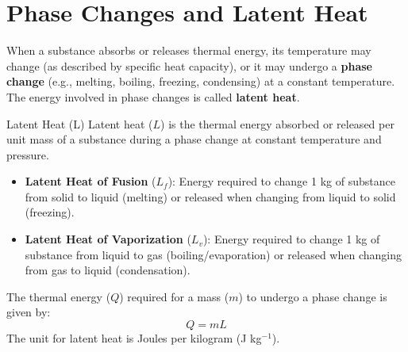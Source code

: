 \section{Phase Changes and Latent Heat}
\label{sec:latent_heat}
\FloatBarrier

When a substance absorbs or releases thermal energy, its temperature may change (as described by specific heat capacity), or it may undergo a \textbf{phase change} (e.g., melting, boiling, freezing, condensing) at a constant temperature. The energy involved in phase changes is called \textbf{latent heat}.

\begin{keyconcept}{Latent Heat (L)}
Latent heat (\(L\)) is the thermal energy absorbed or released per unit mass of a substance during a phase change at constant temperature and pressure.
\begin{itemize}
    \item \textbf{Latent Heat of Fusion} (\(L_f\)): Energy required to change 1 kg of substance from solid to liquid (melting) or released when changing from liquid to solid (freezing).
    \item \textbf{Latent Heat of Vaporization} (\(L_v\)): Energy required to change 1 kg of substance from liquid to gas (boiling/evaporation) or released when changing from gas to liquid (condensation).
\end{itemize}
The thermal energy (\(Q\)) required for a mass (\(m\)) to undergo a phase change is given by:
\begin{equation}
Q = mL
\label{eq:latent_heat}
\end{equation}
The unit for latent heat is Joules per kilogram (J kg\(^{-1}\)).
\end{keyconcept}


